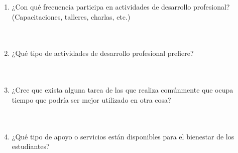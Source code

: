 \documentclass{article}
\begin{document}
\begin{enumerate}[leftmargin=*, label=\arabic*.]
    \item ¿Con qué frecuencia participa en actividades de desarrollo profesional? (Capacitaciones, talleres, charlas, etc.) \\[0.5cm]
        \underline{\hspace{0.95\linewidth}} \vspace{0.3cm} \\
        \underline{\hspace{0.95\linewidth}} \vspace{0.3cm} \\
        \underline{\hspace{0.95\linewidth}} \vspace{0.3cm}

    \item ¿Qué tipo de actividades de desarrollo profesional prefiere? \\[0.5cm]
        \underline{\hspace{0.95\linewidth}} \vspace{0.3cm} \\
        \underline{\hspace{0.95\linewidth}} \vspace{0.3cm} \\
        \underline{\hspace{0.95\linewidth}} \vspace{0.3cm}

    \item ¿Cree que exista alguna tarea de las que realiza comúnmente que ocupa tiempo que podría ser mejor utilizado en otra cosa? \\[0.5cm]
        \underline{\hspace{0.95\linewidth}} \vspace{0.3cm} \\
        \underline{\hspace{0.95\linewidth}} \vspace{0.3cm} \\
        \underline{\hspace{0.95\linewidth}} \vspace{0.3cm}
    \newpage
    \item ¿Qué tipo de apoyo o servicios están disponibles para el bienestar de los estudiantes? \\[0.5cm]
        \underline{\hspace{0.95\linewidth}} \vspace{0.3cm} \\
        \underline{\hspace{0.95\linewidth}} \vspace{0.3cm} \\
        \underline{\hspace{0.95\linewidth}} \vspace{0.3cm}
    

\end{enumerate}
\end{document}
